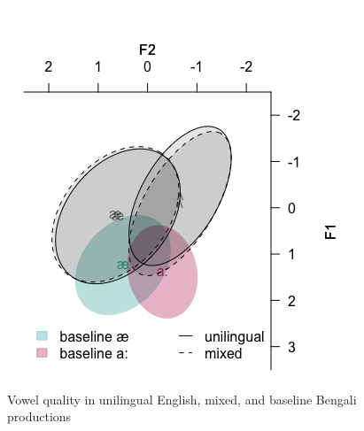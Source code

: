 \documentclass[12 pt]{article}
\begin{document}

\newpage

\begin{figure}[h] %
	\includegraphics[scale=1]{vowels_e_b_final}
	\caption{Vowel quality in unilingual English, mixed, and baseline Bengali productions}
	\label{vowels_e_b}
\end{figure}

\newpage
\end{document}
